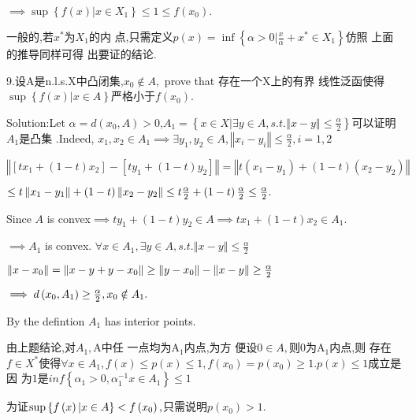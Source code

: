 \documentclass{article}
\begin{document}
$\implies \sup \left\{ f\left( x\right) |x\in X_{1}\right\} \leq 1\leq
f\left( x_{0}\right) .$

一般的,若$x^{\ast }$为$X_{1}$的内%
点,只需定义$p\left( x\right) =\inf \left\{
\alpha >0|\frac{x}{\alpha }+x^{\ast }\in X_{1}\right\} $仿照%
上面的推导同样可得%
出要证的结论.

9.设A是n.l.s.X中凸闭集,$x_{0}\notin A,$%
prove that 存在一个X上的有界%
线性泛函使得 $\sup \left\{ f\left(
x\right) |x\in A\right\} $严格小于$f\left(
x_{0}\right) $.

Solution:Let $\alpha =d\left( x_{0},A\right) >0$,$A_{1}=\left\{ x\in
X|\exists y\in A,s.t.\left\Vert x-y\right\Vert \leq \frac{\alpha }{2}%
\right\} $可以证明$A_{1}$是凸集%
.Indeed, $x_{1},x_{2}\in A_{1}\implies \exists y_{1},y_{2}\in A,\left\Vert
x_{i}-y_{i}\right\Vert \leq \frac{\alpha }{2},i=1,2$

$\left\Vert \left[ tx_{1}+\left( 1-t\right) x_{2}\right] -\left[
ty_{1}+\left( 1-t\right) y_{2}\right] \right\Vert =\left\Vert t\left(
x_{1}-y_{1}\right) +\left( 1-t\right) \left( x_{2}-y_{2}\right) \right\Vert $

$\leq t\left\Vert x_{1}-y_{1}\right\Vert +\left( 1-t\right) \left\Vert
x_{2}-y_{2}\right\Vert \leq t\frac{\alpha }{2}+\left( 1-t\right) \frac{%
\alpha }{2}\leq \frac{\alpha }{2}.$

Since $A$ is convex$\implies ty_{1}+\left( 1-t\right) y_{2}\in A\implies
tx_{1}+\left( 1-t\right) x_{2}\in A_{1}.$

$\implies A_{1}$ is convex. $\forall x\in A_{1},\exists y\in
A,s.t.\left\Vert x-y\right\Vert \leq \frac{\alpha }{2}$

$\left\Vert x-x_{0}\right\Vert =\left\Vert x-y+y-x_{0}\right\Vert \geq
\left\Vert y-x_{0}\right\Vert -\left\Vert x-y\right\Vert \geq \frac{\alpha }{%
2}$

$\bigskip \implies d\left( x_{0},A_{1}\right) \geq \frac{\alpha }{2}%
,x_{0}\notin A_{1}.$

By the defintion $A_{1}$ has interior points.

由上题结论,对$A_{1},$A中任%
一点均为A$_{1}$内点,为方%
便设0$\in A,$则0为A$_{1}$内点,则%
存在$f\in X^{\ast }$使得$\forall x\in A_{1},f\left(
x\right) \leq p\left( x\right) \leq 1,f\left( x_{0}\right) =p\left(
x_{0}\right) \geq 1.p\left( x\right) \leq 1$成立是因%
为$1$是$inf\left\{ \alpha _{1}>0,\alpha _{1}^{-1}x\in
A_{1}\right\} \leq 1$

为证$\bigskip \sup \left\{ f\left( x\right) |x\in A\right\}
<f\left( x_{0}\right) ,$只需说明$p\left(
x_{0}\right) >1.$
\end{document}
